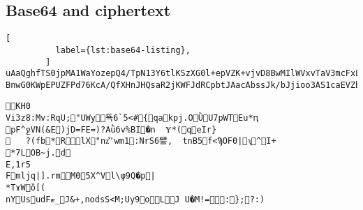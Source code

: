\begin{figure*}[htbp]
\subsection{Base64 and ciphertext}\label{subsec:base64-and-ciphertext}
        \begin{lstlisting}[
          label={lst:base64-listing},
        ]
uAaQghfTS0jpMA1WaYozepQ4/TpN13Y6tlKSzXG0l+epVZK+vjvD8BwMIlWVxvTaV3mcFxL665qBNsFg//81hpU8I660lq/LAXsPcdfq2vr8YRa14+GH+Gtw6YlqLrDU3E8Rhb/IlAvJ8u5VN8pwV1SmBZLTwL7AyEWlp4GodSrX4NSl5grIFoVwRq7kXofVu1aUToD6KJcmo0X
BnwG0KWpEPUZFPd76KcA/QfXHnJHQsaR2jKWFJdRCpbtJAacAbssJk/bJjioo3AS1caEVZbNJctp9xgqVvgQJPyhmYtMLqdjq/SocUscTrLSPiR2X0g5sWByNIm6ses2SJ3dtMYYeOr7+qtVOcoX+U7w2+uLorawsCcXCmXRunEKd5jXiydwXZjzPoKHaT8hGwDB8CNSHxg/JXrezEJ5JKwq3Gio3xEyjD09Cfq5qLn9kENbcDZ/uRZK6+Swxcqg1DYhGngPJbbPkbOpqcXxdLutybYgdGpFN0zCQw3/LNbxYzOBeVhVsXM+GOVEAcKgYpnyCILwKKtFUyaRX2Q7IjdBbKP8NpG7RWZKFtRBVc4YVdWSIRpfek1/lFkq1JrvgK/6KjyyR+m6sb2RzUzxNO1V5uTkH2m8cBUwQBUqjiNEgVQDzTeaYIZqH0j2Is4cblRcCsjoFgX3Nvh4/OvgpgQ==
        \end{lstlisting}
        \begin{lstlisting}[label={lst:ciphertext.listing}, frame=single]
KH0
Vi3z8:Mv:RqU;"UWy뚁6`5<#{qakpj.OȔU7pWTEu*ԥ
pF^ջVN(&E)jD=FE=)?Aǜбv%BI�n	Ɏ*(qeIr}
	?(fb*RlX"nz͒'wm1:NrS6譬,	tnB5f<ϠOF0|ԇ^I+
*7LOB~j.d
E,1r5
Fmljq|].rmM05X^Vl\φ9Q�p|
*TɤWȍ[(
nYUsudFޓ_J&+,nodsS<M;Uy9oLJ U�M!=:};?:)
        \end{lstlisting}
        \caption{The Base64 encoding and relevant ciphertext after AES256.}
    \end{figure*}